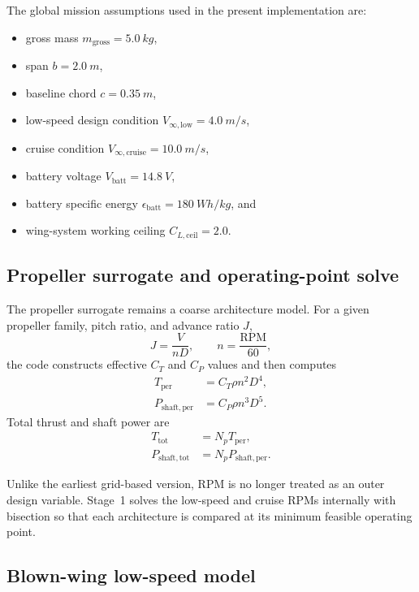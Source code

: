 \documentclass[conf]{new-aiaa}
\begin{document}
The global mission assumptions used in the present implementation are:
\begin{itemize}
\item gross mass \(m_{\mathrm{gross}} = \SI{5.0}{kg}\),
\item span \(b = \SI{2.0}{m}\),
\item baseline chord \(c = \SI{0.35}{m}\),
\item low-speed design condition \(V_{\infty,\mathrm{low}} = \SI{4.0}{m/s}\),
\item cruise condition \(V_{\infty,\mathrm{cruise}} = \SI{10.0}{m/s}\),
\item battery voltage \(V_{\mathrm{batt}} = \SI{14.8}{V}\),
\item battery specific energy \(\epsilon_{\mathrm{batt}} = \SI{180}{Wh/kg}\), and
\item wing-system working ceiling \(C_{L,\mathrm{ceil}} = 2.0\).
\end{itemize}

\subsection{Propeller surrogate and operating-point solve}

The propeller surrogate remains a coarse architecture model. For a given propeller family, pitch ratio, and advance ratio \(J\),
\begin{equation}
J = \frac{V}{nD},
\qquad
n = \frac{\mathrm{RPM}}{60},
\end{equation}
the code constructs effective \(C_T\) and \(C_P\) values and then computes
\begin{align}
T_{\mathrm{per}} &= C_T \rho n^2 D^4, \\
P_{\mathrm{shaft,per}} &= C_P \rho n^3 D^5.
\end{align}
Total thrust and shaft power are
\begin{align}
T_{\mathrm{tot}} &= N_p T_{\mathrm{per}}, \\
P_{\mathrm{shaft,tot}} &= N_p P_{\mathrm{shaft,per}}.
\end{align}

Unlike the earliest grid-based version, RPM is no longer treated as an outer design variable. Stage~1 solves the low-speed and cruise RPMs internally with bisection so that each architecture is compared at its minimum feasible operating point.

\subsection{Blown-wing low-speed model}
\end{document}

